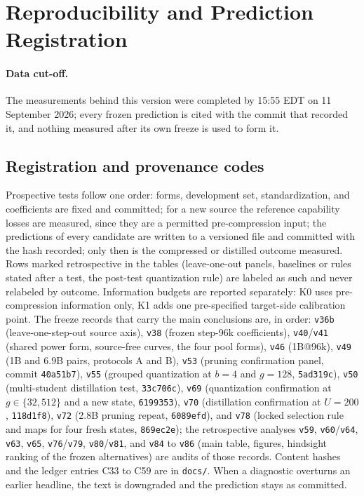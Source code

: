 \section{Reproducibility and Prediction Registration}
\label{sec:app_registration}

\paragraph{Data cut-off.} The measurements behind this version were
completed by 15:55 EDT on 11 September 2026; every frozen prediction
is cited with the commit that recorded it, and nothing measured after
its own freeze is used to form it.
\subsection{Registration and provenance codes}
\label{sec:app_register}
Prospective tests follow one order: forms, development set,
standardization, and coefficients are fixed and committed; for a new
source the reference capability losses are measured, since they are a
permitted pre-compression input; the predictions of every candidate
are written to a versioned file and committed with the hash recorded;
only then is the compressed or distilled outcome measured. Rows
marked retrospective in the tables (leave-one-out panels, baselines or
rules stated after a test, the post-test quantization rule) are
labeled as such and never relabeled by outcome. Information budgets
are reported separately: K0 uses pre-compression information only, K1
adds one pre-specified target-side calibration point. The freeze
records that carry the main conclusions are, in order:
\texttt{v36b} (leave-one-step-out source axis), \texttt{v38}
(frozen step-96k coefficients), \texttt{v40}/\texttt{v41} (shared
power form, source-free curves, the four pool forms), \texttt{v46}
(1B@96k), \texttt{v49} (1B and 6.9B pairs, protocols A and B),
\texttt{v53} (pruning confirmation panel, commit \texttt{40a51b7}),
\texttt{v55} (grouped quantization at $b=4$ and $g=128$,
\texttt{5ad319c}), \texttt{v50} (multi-student distillation test,
\texttt{33c706c}), \texttt{v69} (quantization confirmation at
$g\in\{32,512\}$ and a new state, \texttt{6199353}), \texttt{v70}
(distillation confirmation at $U{=}200$, \texttt{118d1f8}),
\texttt{v72} (2.8B pruning repeat, \texttt{6089efd}), and
\texttt{v78} (locked selection rule and maps for four fresh states,
\texttt{869ec2e}); the retrospective analyses \texttt{v59},
\texttt{v60}/\texttt{v64}, \texttt{v63}, \texttt{v65},
\texttt{v76}/\texttt{v79}, \texttt{v80}/\texttt{v81}, and \texttt{v84} to \texttt{v86} (main table, figures, hindsight ranking of the frozen alternatives) are audits of those records. Content hashes and the ledger entries C33 to C59 are in
\texttt{docs/}. When a diagnostic overturns an earlier headline, the
text is downgraded and the prediction stays as committed.

